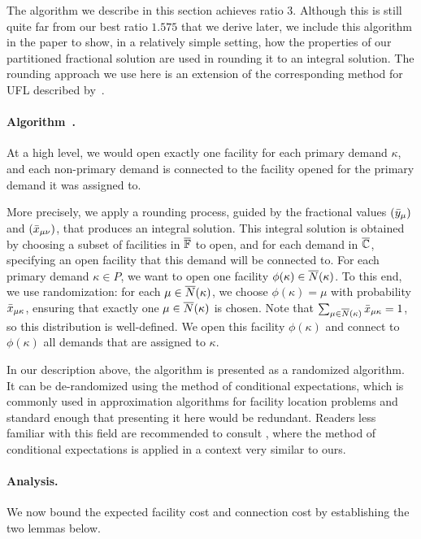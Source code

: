 \documentclass[11pt]{article}
\begin{document}
The algorithm we describe in this section achieves ratio
$3$. Although this is still quite far from our best ratio $1.575$ that
we derive later, we include this algorithm in the paper to show,
in a relatively simple setting, how the properties of our partitioned fractional
solution are used in rounding it to an integral solution.
The rounding approach we use here is an extension of the corresponding
method for UFL described by~\cite{gupta08}.

\paragraph{Algorithm~{\EGUP.}}
At a high level, we would open exactly one facility for each
primary demand $\kappa$, and each non-primary demand is
connected to the facility opened for the primary demand it
was assigned to.

More precisely, we apply a rounding process, guided by the
fractional values $({\bar y}_{\mu})$ and $({\bar x}_{\mu\nu})$,
that produces an integral solution. This integral solution
is obtained by choosing a subset of facilities in
$\overline{\mathbb{F}}$ to open, and for each demand in $\overline{\mathbb{C}}$,
specifying an open facility that this demand will be
connected to.  For each primary demand $\kappa\in P$, we
want to open one facility $\phi(\kappa) \in
{\overline{N}}(\kappa)$. To this end, we use randomization: for each
$\mu\in{\overline{N}}(\kappa)$, we choose $\phi(\kappa) = \mu$ with
probability ${\bar x}_{\mu\kappa}$, ensuring that exactly one
$\mu \in {\overline{N}}(\kappa)$ is chosen. Note that
$\sum_{\mu\in{\overline{N}}(\kappa)}{\bar x}_{\mu\kappa}=1$, so this
distribution is well-defined.  We open this facility
$\phi(\kappa)$ and connect to $\phi(\kappa)$ all demands
that are assigned to $\kappa$.

In our description above, the algorithm is presented as a
randomized algorithm. It can be de-randomized using the
method of conditional expectations, which is commonly used
in approximation algorithms for facility location problems
and standard enough that presenting it here would be
redundant. Readers less familiar with this field are
recommended to consult \cite{ChudakS04}, where the method of
conditional expectations is applied in a context very
similar to ours.


\paragraph{Analysis.}
We now bound the expected facility cost and connection cost
by establishing the two lemmas below.
\end{document}
